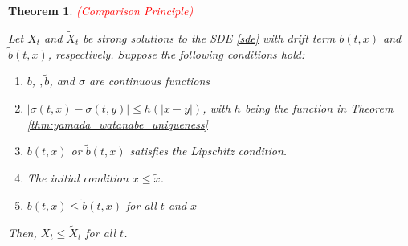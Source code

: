 \documentclass{article}
\newtheorem{theorem}{Theorem}
\begin{document}
\begin{theorem} \textcolor{red}{(Comparison Principle)}

Let $X_t$ and $\tilde{X}_t$ be strong solutions to the SDE \eqref{sde} with drift term $b(t,x)$ and $\tilde{b}(t,x)$, respectively. Suppose the following conditions hold:

\begin{enumerate}
\item
$b$, $,\tilde{b}$, and $\sigma$ are continuous functions

\item
$|\sigma(t,x)-\sigma(t,y)|\leq h(|x-y|)$, with $h$ being the function in Theorem \ref{thm:yamada_watanabe_uniqueness}

\item
$b(t,x)$ or $\tilde{b}(t,x)$ satisfies the Lipschitz condition.

\item
The initial condition $x\leq\tilde{x}$.

\item
$b(t,x)\leq \tilde{b}(t,x)$ for all $t$ and $x$
\end{enumerate}
Then, $X_t\leq\tilde{X}_t$ for all $t$.

\end{theorem}
\end{document}
